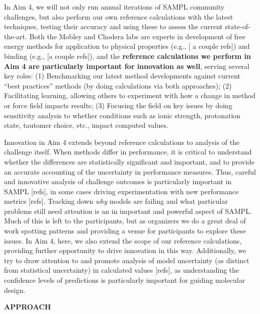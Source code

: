 \documentclass[11pt]{article}
\begin{document}
In Aim 4, we will not only run annual iterations of SAMPL community challenges, but also perform our own reference calculations with the latest techniques, testing their accuracy and using these to assess the current state-of-the-art.
Both the Mobley and Chodera labs are experts in development of free energy methods for application to physical properties (e.g., [ a couple refs]) and binding (e.g., [a couple refs]), and the \textbf{reference calculations we perform in Aim 4 are particularly important for innovation as well}, serving several key roles: (1) Benchmarking our latest method developments against current ``best practices'' methods (by doing calculations via both approaches); (2) Facilitating learning, allowing others to experiment with how a change in method or force field impacts results; (3) Focusing the field on key issues by doing sensitivity analysis to whether conditions such as ionic strength, protonation state, tautomer choice, etc., impact computed values.

Innovation in Aim 4 extends beyond reference calculations to analysis of the challenge itself.
When methods differ in performance, it is critical to understand whether the differences are statistically significant and important, and to provide an accurate accounting of the uncertainty in performance measures. 
Thus, careful and innovative analysis of challenge outcomes is particularly important in SAMPL [refs], in some cases driving experimentation with new performance metrics [refs].
Tracking down \emph{why} models are failing and what particular problems still need attention is an in important and powerful aspect of SAMPL.
Much of this is left to the participants, but as organizers we do a great deal of work spotting patterns and providing a venue for participants to explore these issues.
In Aim 4, here, we also extend the scope of our reference calculations, providing further opportunity to drive innovation in this way.
Additionally, we try to draw attention to and promote analysis of model uncertainty (as distinct from statistical uncertainty) in calculated values [refs], as understanding the confidence levels of predictions is particularly important for guiding molecular design.


{\large \bf APPROACH}
\end{document}
